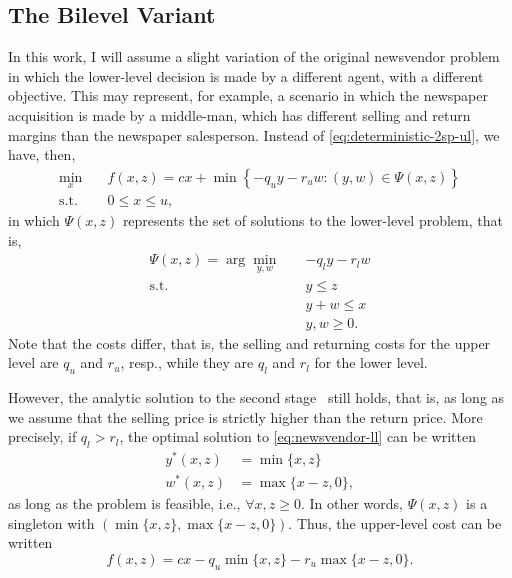 \documentclass[12pt]{article}
\begin{document}
\subsection*{The Bilevel Variant}

In this work, I will assume a slight variation of the original newsvendor problem in which the lower-level decision is made by a different agent, with a different objective.
This may represent, for example, a scenario in which the newspaper acquisition is made by a middle-man, which has different selling and return margins than the newspaper salesperson. 
Instead of \eqref{eq:deterministic-2sp-ul}, we have, then,
\begin{equation}\label{eq:newsvendor-ul}
\begin{split}
    \min_{x} \quad & f(x,z) = cx + \min\left\{ -q_u y -r_u w : (y,w)\in \Psi(x,z) \right\}  \\
    \textrm{s.t.} \quad & 0\le x\le u
,\end{split}
\end{equation}
in which $\Psi(x,z)$ represents the set of solutions to the lower-level problem, that is,
\begin{equation}\label{eq:newsvendor-ll}
\begin{split}
    \Psi(x,z) = \arg\min_{y,w} \quad & -q_l y - r_l w \\
    \textrm{s.t.} \quad & y\le z \\
      & y+w \le x \\
      & y,w \ge 0
.\end{split}
\end{equation}
Note that the costs differ, that is, the selling and returning costs for the upper level are $q_u$ and $r_u$, resp., while they are $q_l$ and $r_l$ for the lower level.

However, the analytic solution to the second stage~\citep{birgeIntroductionStochasticProgramming2011} still holds, that is, as long as we assume that the selling price is strictly higher than the return price.
More precisely, if $q_l > r_l$, the optimal solution to \eqref{eq:newsvendor-ll} can be written
\begin{align}\label{eq:newsvendor-analytic-solution}
    y^{*}(x,z) &= \min\{x,z\} \\
    w^{*}(x,z) &= \max\{x-z, 0\}
,\end{align}
as long as the problem is feasible, i.e., $\forall x,z \ge 0$.
In other words, $\Psi(x,z)$ is a singleton with  $(\min\{x,z\},\max\{x-z, 0\})$.
Thus, the upper-level cost can be written
\begin{equation}\label{eq:newsvendor-analytic-ul-cost}
    f(x,z) = cx -q_u \min\{x,z\} - r_u \max\{x-z, 0\}
.\end{equation}
\end{document}
